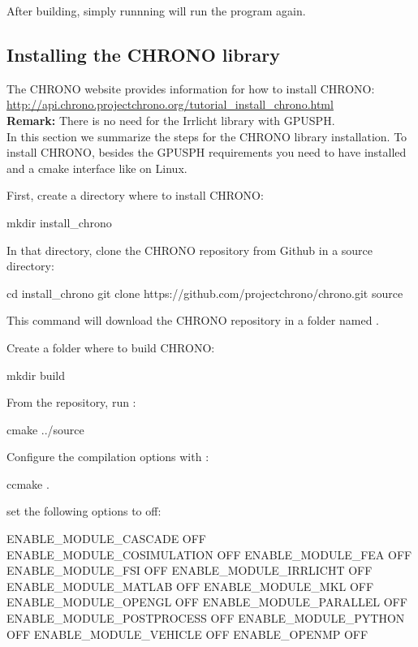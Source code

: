 \documentclass{../GPUSPHtemplate}
\begin{document}
After building, simply runnning  will run the program
again.

\subsection{Installing the CHRONO library}

The CHRONO website provides information for how to install CHRONO:\\
\url{http://api.chrono.projectchrono.org/tutorial_install_chrono.html}\\

\textbf{Remark:} There is no need for the Irrlicht library with GPUSPH.\\

In this section we summarize the steps for the CHRONO library installation.
To install CHRONO, besides the GPUSPH requirements you need to have  installed
and a cmake interface like  on Linux.

First, create a directory where to install CHRONO:
\begin{shellcode}
mkdir install_chrono
\end{shellcode}
In that directory, clone the CHRONO repository from Github in a source directory:
\begin{shellcode}
cd install_chrono
git clone https://github.com/projectchrono/chrono.git source
\end{shellcode}
This command will download the CHRONO repository in a folder named .

Create a folder where to build CHRONO:
\begin{shellcode}
mkdir build
\end{shellcode}
From the  repository, run :
\begin{shellcode}
cmake ../source
\end{shellcode}
Configure the compilation options with :
\begin{shellcode}
ccmake .
\end{shellcode}
set the following options to off:
\begin{shellcode}
 ENABLE_MODULE_CASCADE            OFF
 ENABLE_MODULE_COSIMULATION       OFF
 ENABLE_MODULE_FEA                OFF
 ENABLE_MODULE_FSI                OFF
 ENABLE_MODULE_IRRLICHT           OFF
 ENABLE_MODULE_MATLAB             OFF
 ENABLE_MODULE_MKL                OFF
 ENABLE_MODULE_OPENGL             OFF
 ENABLE_MODULE_PARALLEL           OFF
 ENABLE_MODULE_POSTPROCESS        OFF
 ENABLE_MODULE_PYTHON             OFF
 ENABLE_MODULE_VEHICLE            OFF
 ENABLE_OPENMP                    OFF
\end{shellcode}
\end{document}

